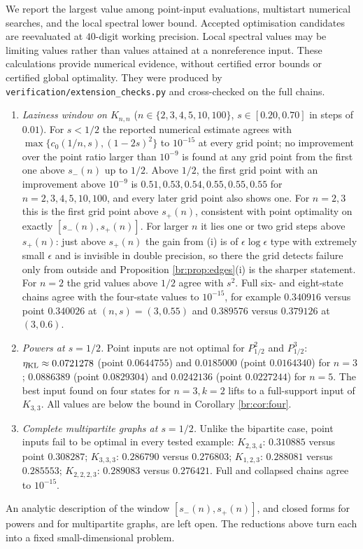 \begin{remark}\label{br:rem:numerics}
We report the largest value among point-input evaluations, multistart
numerical searches, and the local spectral lower bound. Accepted
optimisation candidates are reevaluated at \(40\)-digit working precision.
Local spectral values may be limiting values rather than values attained at
a nonreference input. These calculations provide numerical evidence, without
certified error bounds or certified global optimality. They were produced by
\texttt{verification/extension\_checks.py} and cross-checked on the full
chains.
\begin{enumerate}[label=(\alph*)]
\item \emph{Laziness window on \(K_{n,n}\)} (\(n\in\{2,3,4,5,10,100\}\),
\(s\in[0.20,0.70]\) in steps of \(0.01\)). For \(s<1/2\) the reported numerical estimate
agrees with \(\max\{c_0(1/n,s),(1-2s)^2\}\) to \(10^{-15}\) at every grid
point; no improvement over the point ratio larger than \(10^{-9}\) is found at
any grid point from the first one above \(s_-(n)\) up to \(1/2\).
Above \(1/2\), the first grid point with an improvement above \(10^{-9}\)
is \(0.51,0.53,0.54,0.55,0.55,0.55\) for \(n=2,3,4,5,10,100\), and every
later grid point also shows one. For \(n=2,3\) this is the first grid point
above \(s_+(n)\), consistent with point optimality on exactly
\([s_-(n),s_+(n)]\). For larger \(n\) it lies one or two grid steps above
\(s_+(n)\): just above \(s_+(n)\) the gain from (i) is of
\(\epsilon\log\epsilon\) type with extremely small \(\epsilon\) and is
invisible in double precision, so there the grid detects failure only from
outside and Proposition \ref{br:prop:edges}(i) is the sharper statement. For
\(n=2\) the grid values above \(1/2\) agree with \(s^2\).
Full six- and eight-state chains agree with the four-state values to
\(10^{-15}\), for example \(0.340916\) versus point \(0.340026\) at
\((n,s)=(3,0.55)\) and \(0.389576\) versus \(0.379126\) at \((3,0.6)\).
\item \emph{Powers at \(s=1/2\).} Point inputs are not optimal for
\(P_{1/2}^2\) and \(P_{1/2}^3\):
\(\eta_{\mathrm{KL}}\approx0.0721278\) (point \(0.0644755\)) and \(0.0185000\)
(point \(0.0164340\)) for \(n=3\); \(0.0886389\) (point \(0.0829304\)) and
\(0.0242136\) (point \(0.0227244\)) for \(n=5\). The best input found on four states
for \(n=3,k=2\) lifts to a full-support input of \(K_{3,3}\). All values are
below the bound in Corollary \ref{br:cor:four}.
\item \emph{Complete multipartite graphs at \(s=1/2\).} Unlike the bipartite
case, point inputs fail to be optimal in every tested example:
\(K_{2,3,4}\): \(0.310885\) versus point \(0.308287\);
\(K_{3,3,3}\): \(0.286790\) versus \(0.276803\);
\(K_{1,2,3}\): \(0.288081\) versus \(0.285553\);
\(K_{2,2,2,3}\): \(0.289083\) versus \(0.276421\).
Full and collapsed chains agree to \(10^{-15}\).
\end{enumerate}
An analytic description of the window \([s_-(n),s_+(n)]\), and closed forms
for powers and for multipartite graphs, are left open. The reductions above
turn each into a fixed small-dimensional problem.
\end{remark}
